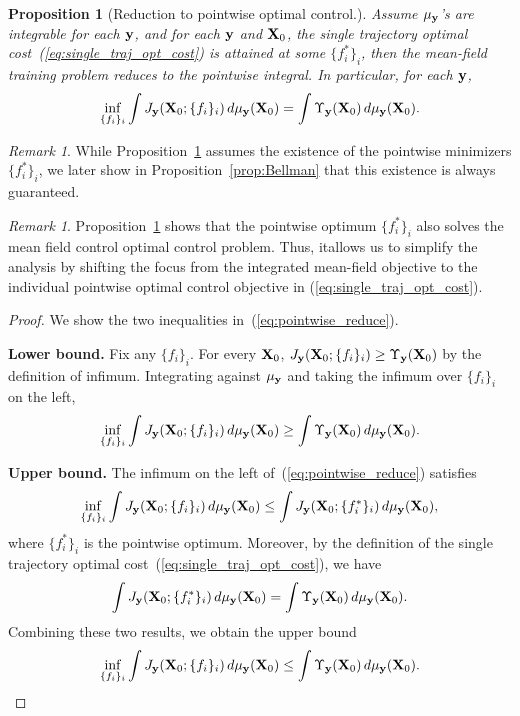\documentclass[journal]{IEEEtran}
\def\eqref#1{equation~\ref{#1}}
\newcommand{\bfX}{{\bf X}}
\newcommand{\bfy}{ {\bf y}}
\renewcommand{\eqref}[1]{(\ref{#1})}
\theoremstyle{plain}
\newtheorem{proposition}[theorem]{Proposition}
\theoremstyle{definition}
\theoremstyle{remark}
\newtheorem{remark}[theorem]{Remark}
\begin{document}
\begin{proposition}[Reduction to pointwise optimal control.]\label{prop:pointwise} Assume $\mu_\bfy$'s are integrable for each $\bfy$, and for each $\bfy$ and $\bfX_0$, the single trajectory optimal cost~\eqref{eq:single_traj_opt_cost} is attained at some $\{f_i^*\}_i$, then the mean-field training problem reduces to the pointwise integral. In particular, for each $\bfy$,
\begin{equation}\label{eq:pointwise_reduce}
    \inf_{\{f_i\}_i} \int J_\bfy(\bfX_0; \{f_i\}_i) \, d\mu_\bfy(\bfX_0) = \int \Upsilon_\bfy(\bfX_0) \, d\mu_\bfy(\bfX_0).
\end{equation}
\end{proposition}

\begin{remark}
    While Proposition~\ref{prop:pointwise} assumes the existence of the pointwise minimizers $\{f_i^*\}_i$, we later show in Proposition~\ref{prop:Bellman} that this existence is always guaranteed.
\end{remark}

\begin{remark}
    Proposition~\ref{prop:pointwise} shows that the pointwise optimum $\{ f_i^*\}_i$ also solves the mean field control optimal control problem. Thus, itallows us to simplify the analysis by shifting the focus from the integrated mean-field objective to the individual pointwise optimal control objective in \eqref{eq:single_traj_opt_cost}.
\end{remark}

\begin{proof}
    We show the two inequalities in~\eqref{eq:pointwise_reduce}. 

    \textbf{Lower bound.} Fix any $\{f_i\}_i$. For every $\bfX_0$, $J_\bfy(\bfX_0; \{f_i\}_i) \geq \Upsilon_\bfy(\bfX_0)$ by the definition of infimum. Integrating against $\mu_\bfy$ and taking the infimum over $\{f_i\}_i$ on the left,
    \[
    \inf_{\{f_i\}_i} \int J_\bfy(\bfX_0; \{f_i\}_i) \, d\mu_\bfy(\bfX_0) \geq \int \Upsilon_\bfy(\bfX_0) \, d\mu_\bfy(\bfX_0).
    \]

    \textbf{Upper bound.} The infimum on the left of~\eqref{eq:pointwise_reduce} satisfies 
    \begin{align*}
        \inf_{\{f_i\}_i} \int J_\bfy(\bfX_0; \{f_i\}_i) \, d\mu_\bfy(\bfX_0) \leq \int J_\bfy(\bfX_0; \{f_i^*\}_i) \, d\mu_\bfy(\bfX_0),
    \end{align*}
    where $\{f_i^*\}_i$ is the pointwise optimum. Moreover, by the definition of the single trajectory optimal cost~\eqref{eq:single_traj_opt_cost}, we have
    \[
    \int J_\bfy(\bfX_0; \{f_i^*\}_i) \, d\mu_\bfy(\bfX_0) = \int \Upsilon_\bfy(\bfX_0) \, d\mu_\bfy(\bfX_0).
    \]
    Combining these two results, we obtain the upper bound
    \[
    \inf_{\{f_i\}_i} \int J_\bfy(\bfX_0; \{f_i\}_i) \, d\mu_\bfy(\bfX_0) \leq \int \Upsilon_\bfy(\bfX_0) \, d\mu_\bfy(\bfX_0).
    \]
\end{proof}
\end{document}
